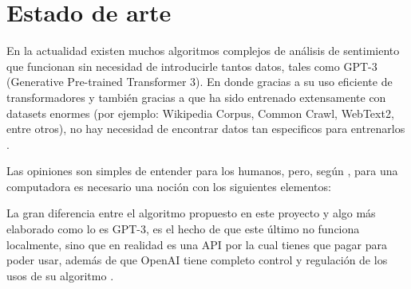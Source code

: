\documentclass[a4]{sciposter}
\begin{document}
\begin{multicols}{3}
\begin{figure}
\end{figure}

\section{Estado de arte}

En la actualidad existen muchos algoritmos complejos de análisis de sentimiento que funcionan sin necesidad de introducirle tantos datos, tales como GPT-3 (Generative Pre-trained Transformer 3). En donde gracias a su uso eficiente de transformadores y también gracias a que ha sido entrenado extensamente con datasets enormes (por ejemplo: Wikipedia Corpus, Common Crawl, WebText2, entre otros), no hay necesidad de encontrar datos tan especificos para entrenarlos \citep{gpt3}.

Las opiniones son simples de entender para los humanos, pero, según \citet{liu}, para una computadora es necesario una noción con los siguientes elementos:



La gran diferencia entre el algoritmo propuesto en este proyecto y algo más elaborado como lo es GPT-3, es el hecho de que este último no funciona localmente, sino que en realidad es una API por la cual tienes que pagar para poder usar, además de que OpenAI tiene completo control y regulación de los usos de su algoritmo \citep{openai}. 


\end{multicols}
\end{document}

